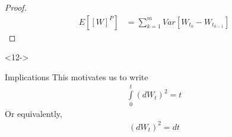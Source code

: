 \documentclass[10pt]{beamer}
\begin{document}
\begin{frame}[t]
\begin{onlyenv}
\begin{proof}
      \begin{align*}
        E\left[[W]^{P}\right] &= \displaystyle\sum_{k = 1}^{m}Var\left[W_{t_k} - W_{t_{k-1}}\right]
      \end{align*}
      \end{proof}
    \end{onlyenv}
    \begin{onlyenv}<12->
      \begin{block}{Implications}
        This motivates us to write 
        \begin{align*}
          \int\limits_{0}^{t}(dW_t)^2 = t
        \end{align*}
        Or equivalently,
        \begin{align*}
          (dW_t)^2 = dt
        \end{align*}
      \end{block}
  \end{onlyenv}
\end{frame}
\end{document}
